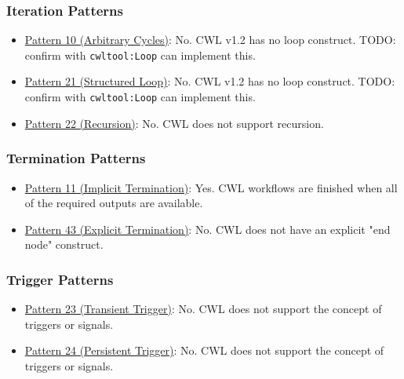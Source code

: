 \subsubsection{Iteration Patterns}
\begin{itemize}
\item \href{http://www.workflowpatterns.com/patterns/control/structural/wcp10.php}{Pattern 10 (Arbitrary Cycles)}: No. CWL v1.2 has no loop construct. TODO: confirm with \verb|cwltool:Loop| can implement this.

\item \href{http://www.workflowpatterns.com/patterns/control/new/wcp21.php}{Pattern 21 (Structured Loop)}: No. CWL v1.2 has no loop construct. TODO: confirm with \verb|cwltool:Loop| can implement this.

\item \href{http://www.workflowpatterns.com/patterns/control/new/wcp22.php}{Pattern 22 (Recursion)}: No. CWL does not support recursion.
\end{itemize}
\subsubsection{Termination Patterns}
\begin{itemize}
\item \href{http://www.workflowpatterns.com/patterns/control/structural/wcp11.php}{Pattern 11 (Implicit Termination)}: Yes. CWL workflows are finished when all of the required outputs are available.

\item \href{http://www.workflowpatterns.com/patterns/control/new/wcp43.php}{Pattern 43 (Explicit Termination)}: No. CWL does not have an explicit "end node" construct.
\end{itemize}
\subsubsection{Trigger Patterns}
\begin{itemize}
\item \href{http://www.workflowpatterns.com/patterns/control/new/wcp23.php}{Pattern 23 (Transient Trigger)}: No. CWL does not support the concept of triggers or signals.

\item \href{http://www.workflowpatterns.com/patterns/control/new/wcp24.php}{Pattern 24 (Persistent Trigger)}: No. CWL does not support the concept of triggers or signals.
\end{itemize}
